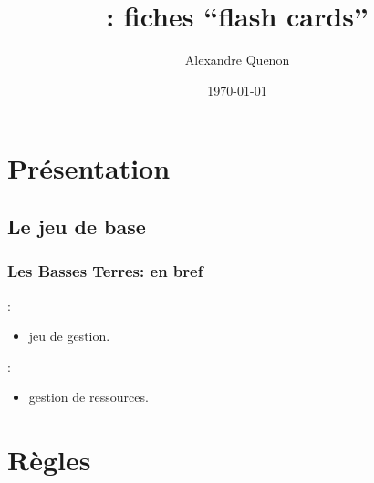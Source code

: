 \documentclass[11pt]{beamer}
\title[\thegame{} : fiches]{\thegame{}: fiches \enquote{flash cards}}
\author[A. Quenon]{Alexandre Quenon}
\date{\today}
\newcommand{\thegame}{Les Basses Terres}
\begin{document}
\frame{\titlepage}


\begin{frame}
	\tableofcontents
\end{frame}



\section{Présentation}


\subsection{Le jeu de base}

	\begin{frame}
		\frametitle{\thegame{}: en bref}
		
		:
		\begin{itemize}
			\item jeu de gestion.
		\end{itemize}
	
		\vspace*{1ex}
		
		:
		\begin{itemize}
			\item gestion de ressources.
		\end{itemize}
	\end{frame}


%
%		



\section{Règles}
\end{document}

